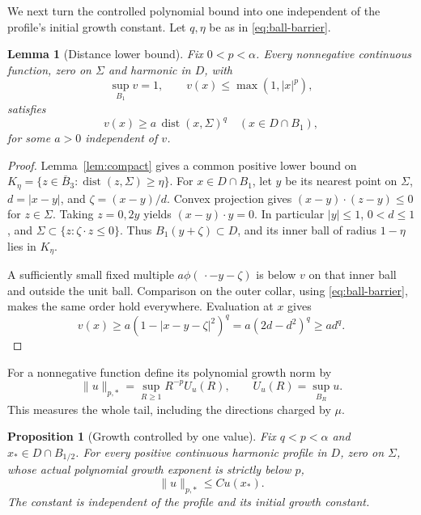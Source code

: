 \documentclass[11pt]{article}
\newtheorem{proposition}[theorem]{Proposition}
\newtheorem{lemma}[theorem]{Lemma}
\numberwithin{equation}{section}
\newcommand{\dist}{\operatorname{dist}}
\begin{document}
We next turn the controlled polynomial bound into one independent of the
profile's initial growth constant. Let \(q,\eta\) be as in
\eqref{eq:ball-barrier}.

\begin{lemma}[Distance lower bound]\label{lem:distance}
Fix \(0<p<\alpha\). Every nonnegative continuous function, zero on \(\Sigma\)
and harmonic in \(D\), with
\begin{equation}\label{eq:unit-family}
 \sup_{B_1}v=1,\qquad v(x)\le\max(1,|x|^p),
\end{equation}
satisfies
\begin{equation}\label{eq:distance-lower}
 v(x)\ge a\,\dist(x,\Sigma)^q\quad(x\in D\cap B_1),
\end{equation}
for some \(a>0\) independent of \(v\).
\end{lemma}

\begin{proof}
Lemma~\ref{lem:compact} gives a common positive lower bound on
\(K_\eta=\{z\in\overline B_3:\dist(z,\Sigma)\ge\eta\}\).
For \(x\in D\cap B_1\), let \(y\) be its nearest point on \(\Sigma\),
\(d=|x-y|\), and \(\zeta=(x-y)/d\). Convex projection gives
\((x-y)\cdot(z-y)\le0\) for \(z\in\Sigma\).
Taking \(z=0,2y\) yields \((x-y)\cdot y=0\). In particular
\(|y|\le1\), \(0<d\le1\), and
\(\Sigma\subset\{z:\zeta\cdot z\le0\}\).
Thus \(B_1(y+\zeta)\subset D\), and its inner ball of radius
\(1-\eta\) lies in \(K_\eta\).

A sufficiently small fixed multiple \(a\phi(\,\cdot-y-\zeta)\) is below
\(v\) on that inner ball and outside the unit ball. Comparison on the
outer collar, using \eqref{eq:ball-barrier}, makes the same order hold
everywhere. Evaluation at \(x\) gives
\[
 v(x)\ge a(1-|x-y-\zeta|^2)^q
        =a(2d-d^2)^q\ge a d^q.
\]
\end{proof}

For a nonnegative function define its polynomial growth norm by
\begin{equation}\label{eq:growth-norm}
 \|u\|_{p,*}=\sup_{R\ge1}R^{-p}U_u(R),
 \qquad U_u(R)=\sup_{B_R}u.
\end{equation}
This measures the whole tail, including the directions charged by \(\mu\).

\begin{proposition}[Growth controlled by one value]\label{prop:growth}
Fix \(q<p<\alpha\) and \(x_*\in D\cap B_{1/2}\).
For every positive continuous harmonic profile in \(D\), zero on \(\Sigma\),
whose actual polynomial growth exponent is strictly below \(p\),
\begin{equation}\label{eq:growth-control}
 \|u\|_{p,*}\le C u(x_*).
\end{equation}
The constant is independent of the profile and its initial growth constant.
\end{proposition}
\end{document}
